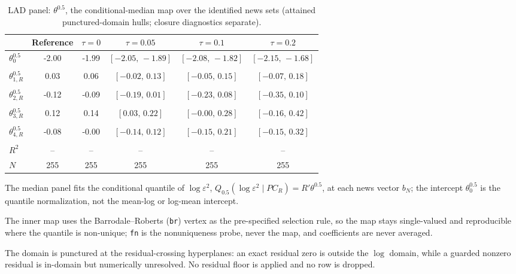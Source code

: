 \documentclass[11pt]{article}
\begin{document}
\begin{table}[!htbp]
\centering
\begin{threeparttable}
\caption{LAD panel: $\theta^{0.5}$, the conditional-median map over the identified news sets (attained punctured-domain hulls; closure diagnostics separate).}
\label{tab:log_var_eq_panel_lad}
\footnotesize\setlength{\tabcolsep}{3pt}
\begin{tabular}{lccccc}
\toprule
 & Reference & $\tau{=}0$ & $\tau{=}0.05$ & $\tau{=}0.1$ & $\tau{=}0.2$ \\
\midrule
$\theta^{0.5}_0$ & -2.00 & -1.99 & $[-2.05,\,-1.89]$ & $[-2.08,\,-1.82]$ & $[-2.15,\,-1.68]$ \\
 &  &  &  &  &  \\
\midrule
$\theta^{0.5}_{1,R}$ & 0.03 & 0.06 & $[-0.02,\,0.13]$ & $[-0.05,\,0.15]$ & $[-0.07,\,0.18]$ \\
 &  &  &  &  &  \\
$\theta^{0.5}_{2,R}$ & -0.12 & -0.09 & $[-0.19,\,0.01]$ & $[-0.23,\,0.08]$ & $[-0.35,\,0.10]$ \\
 &  &  &  &  &  \\
$\theta^{0.5}_{3,R}$ & 0.12 & 0.14 & $[0.03,\,0.22]$ & $[-0.00,\,0.28]$ & $[-0.16,\,0.42]$ \\
 &  &  &  &  &  \\
$\theta^{0.5}_{4,R}$ & -0.08 & -0.00 & $[-0.14,\,0.12]$ & $[-0.15,\,0.21]$ & $[-0.15,\,0.32]$ \\
 &  &  &  &  &  \\
$R^2$ & -- & -- & -- & -- & -- \\
$N$ & 255 & 255 & 255 & 255 & 255 \\
\bottomrule
\end{tabular}
\begin{tablenotes}[flushleft]
\scriptsize
\item The median panel fits the conditional quantile of $\log \varepsilon^2$, $Q_{0.5}(\log \varepsilon^2 \mid PC_R) = R'\theta^{0.5}$, at each news vector $b_N$; the intercept $\theta^{0.5}_0$ is the quantile normalization, not the mean-log or log-mean intercept.
\item The inner map uses the Barrodale--Roberts (\texttt{br}) vertex as the pre-specified selection rule, so the map stays single-valued and reproducible where the quantile is non-unique; \texttt{fn} is the nonuniqueness probe, never the map, and coefficients are never averaged.
\item The domain is punctured at the residual-crossing hyperplanes: an exact residual zero is outside the $\log$ domain, while a guarded nonzero residual is in-domain but numerically unresolved. No residual floor is applied and no row is dropped.

\end{tablenotes}
\end{threeparttable}
\end{table}
\end{document}
